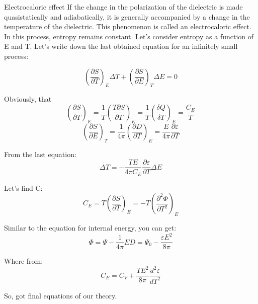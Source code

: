 \documentclass [xcolor=svgnames, t] {beamer}
\begin{document}
\begin{frame}{Electrocaloric effect}
If the change in the polarization of the dielectric is made quasistatically and adiabatically, it is generally accompanied by a change in the temperature of the dielectric. This phenomenon is called an electrocaloric effect. \\

In this process, entropy remains constant. Let's consider entropy as a function of E and T. Let's write down the last obtained equation for an infinitely small process:
\begin{block}

\begin{equation}
(\frac{\partial S}{\partial T})_E \Delta T + (\frac{\partial S}{\partial E})_T \Delta E = 0
\end{equation}
\end{block}
\end{frame}
\begin{frame}{}
\vspace{0.4cm}
\begin{block}{Obviously, that}
\begin{equation}
(\frac{\partial S}{\partial T})_E = \frac{1}{T}(\frac{T \partial S}{\partial T})_E = \frac{1}{T} (\frac{\delta Q}{\delta T})_E = \frac{C_E}{T}
\end{equation}
\begin{equation}
(\frac{\partial S}{\partial E})_T = \frac{1}{4\pi}(\frac{\partial D}{\partial T})_E = \frac{E}{4\pi} \frac{\partial \varepsilon}{\partial T}
\end{equation}
\end{block}
\vspace{0.4cm}
\begin{block}{From the last equation:}
\begin{equation}
   \Delta T = -\frac{TE}{4\pi C_E} \frac{\partial \varepsilon}{\partial T} \Delta E
   \end{equation}
\end{block}{}
\end{frame}{}

 \begin{frame}{}
     \begin{block}{Let’s find C:}
     \begin{equation}
     C_E = T(\frac{\partial S}{\partial T})_E = -T(\frac{\partial^2 \Phi}{\partial T^2})_E
     \end{equation}
     \end{block}{}
    \begin{block}{Similar to the equation for internal energy, you can get:}
    \begin{equation}
\Phi = \Psi - \frac{1}{4\pi}ED = \Psi_0 - \frac{\varepsilon E^2}{8\pi}
\end{equation}
\end{block}
\begin{block}{Where from:}
\begin{equation}
    C_E = C_V + \frac{TE^2}{8\pi} \frac{d^2 \varepsilon}{dT^2}
    \end{equation}
 \end{block}   
 \vspace{0.2cm}
 So, got final equations of our theory.  
\end{frame}{}
\end{document}
